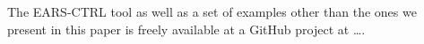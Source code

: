 The \textsf{EARS-CTRL} tool as well as a set of examples other than the ones we
present in this paper is freely available at a GitHub project at \ldots.

% 


